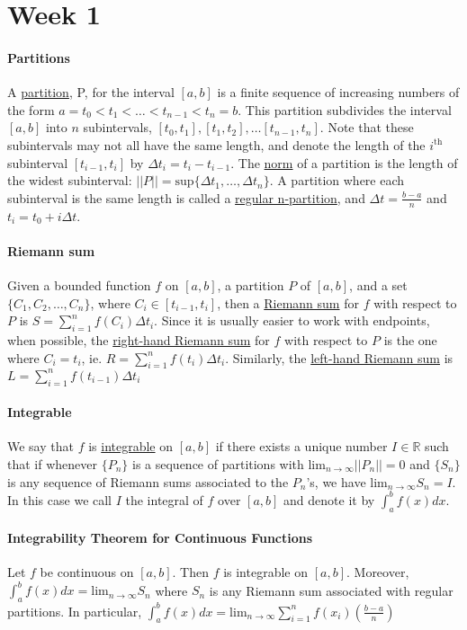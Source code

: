 \documentclass[10pt,letter]{article}
\begin{document}
\section*{Week 1}
\paragraph{Partitions} A \underline{partition}, P, for the interval $[a,b]$ is a finite sequence of increasing numbers of the form $a=t_0<t_1<\ldots<t_{n-1}<t_n=b$. This partition subdivides the interval $[a,b]$ into $n$ subintervals, $[t_0,t_1], [t_1,t_2], \ldots [t_{n-1}, t_n]$. Note that these subintervals may not all have the same length, and denote the length of the $i^{\text{th}}$ subinterval $[t_{i-1},t_i]$ by $\Delta t_i=t_i-t_{i-1}$. The \underline{norm} of a partition is the length of the widest subinterval: $||P||=\text{sup}\{\Delta t_1,\ldots ,\Delta t_n\}$. A partition where each subinterval is the same length is called a \underline{regular n-partition}, and $\Delta t=\frac{b-a}{n}$ and $t_i = t_0+i\Delta t$.

\paragraph{Riemann sum} Given a bounded function $f$ on $[a,b]$, a partition $P$ of $[a,b]$, and a set $\{C_1,C_2,\ldots, C_n\}$, where $C_i\in[t_{i-1},t_i]$, then a \underline{Riemann sum} for $f$ with respect to $P$ is $S=\sum_{i=1}^n f(C_i)\Delta t_i$. Since it is usually easier to work with endpoints, when possible, the \underline{right-hand Riemann sum} for $f$ with respect to $P$ is the one where $C_i=t_i$, ie. $R=\sum_{i=1}^nf(t_i)\Delta t_i$. Similarly, the \underline{left-hand Riemann sum} is $L=\sum_{i=1}^n f(t_{i-1})\Delta t_i$

\paragraph{Integrable} We say that $f$ is \underline{integrable} on $[a,b]$ if there exists a unique number $I\in\mathbb{R}$ such that if whenever $\{P_n\}$ is a sequence of partitions with lim$_{n\rightarrow\infty}||P_n||=0$ and $\{S_n\}$ is any sequence of Riemann sums associated to the $P_n$'s, we have lim$_{n\rightarrow\infty}S_n=I$. In this case we call $I$ the integral of $f$ over $[a,b]$ and denote it by $\int_a^b f(x)dx$. 

\paragraph{Integrability Theorem for Continuous Functions} Let $f$ be continuous on $[a,b]$. Then $f$ is integrable on $[a,b]$. Moreover, $\int_a^bf(x)dx=\text{lim}_{n\rightarrow\infty}S_n$ where $S_n$ is any Riemann sum associated with regular partitions. In particular, $\int_a^bf(x)dx=\text{lim}_{n\rightarrow\infty}\sum_{i=1}^nf(x_i)\left(\frac{b-a}{n}\right)$
\end{document}

